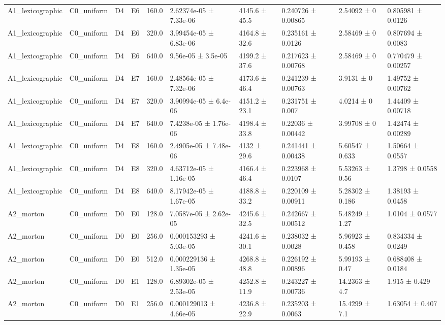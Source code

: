 \begin{table}
\begin{tabular}{llllllllll}
A1\_lexicographic & C0\_uniform & D4 & E6 & 160.0 & 2.62374e-05 ± 7.33e-06 & 4145.6 ± 45.5 & 0.240726 ± 0.00865 & 2.54092 ± 0 & 0.805981 ± 0.0126 \\
A1\_lexicographic & C0\_uniform & D4 & E6 & 320.0 & 3.99454e-05 ± 6.83e-06 & 4164.8 ± 32.6 & 0.235161 ± 0.0126 & 2.58469 ± 0 & 0.807694 ± 0.0083 \\
A1\_lexicographic & C0\_uniform & D4 & E6 & 640.0 & 9.56e-05 ± 3.5e-05 & 4199.2 ± 37.6 & 0.217623 ± 0.00768 & 2.58469 ± 0 & 0.770479 ± 0.00257 \\
A1\_lexicographic & C0\_uniform & D4 & E7 & 160.0 & 2.48564e-05 ± 7.32e-06 & 4173.6 ± 46.4 & 0.241239 ± 0.00763 & 3.9131 ± 0 & 1.49752 ± 0.00762 \\
A1\_lexicographic & C0\_uniform & D4 & E7 & 320.0 & 3.90994e-05 ± 6.4e-06 & 4151.2 ± 23.1 & 0.231751 ± 0.007 & 4.0214 ± 0 & 1.44409 ± 0.00718 \\
A1\_lexicographic & C0\_uniform & D4 & E7 & 640.0 & 7.4238e-05 ± 1.76e-06 & 4198.4 ± 33.8 & 0.22036 ± 0.00442 & 3.99708 ± 0 & 1.42474 ± 0.00289 \\
A1\_lexicographic & C0\_uniform & D4 & E8 & 160.0 & 2.4905e-05 ± 7.48e-06 & 4132 ± 29.6 & 0.241441 ± 0.00438 & 5.60547 ± 0.633 & 1.50664 ± 0.0557 \\
A1\_lexicographic & C0\_uniform & D4 & E8 & 320.0 & 4.63712e-05 ± 1.16e-05 & 4166.4 ± 46.4 & 0.223968 ± 0.0107 & 5.53263 ± 0.56 & 1.3798 ± 0.0558 \\
A1\_lexicographic & C0\_uniform & D4 & E8 & 640.0 & 8.17942e-05 ± 1.67e-05 & 4188.8 ± 33.2 & 0.220109 ± 0.00911 & 5.28302 ± 0.186 & 1.38193 ± 0.0458 \\
A2\_morton & C0\_uniform & D0 & E0 & 128.0 & 7.0587e-05 ± 2.62e-05 & 4245.6 ± 32.5 & 0.242667 ± 0.00512 & 5.48249 ± 1.27 & 1.0104 ± 0.0577 \\
A2\_morton & C0\_uniform & D0 & E0 & 256.0 & 0.000153293 ± 5.03e-05 & 4241.6 ± 30.1 & 0.238032 ± 0.0028 & 5.96923 ± 0.458 & 0.834334 ± 0.0249 \\
A2\_morton & C0\_uniform & D0 & E0 & 512.0 & 0.000229136 ± 1.35e-05 & 4268.8 ± 48.8 & 0.226192 ± 0.00896 & 5.99193 ± 0.47 & 0.688408 ± 0.0184 \\
A2\_morton & C0\_uniform & D0 & E1 & 128.0 & 6.89302e-05 ± 2.53e-05 & 4252.8 ± 11.9 & 0.243227 ± 0.00736 & 14.2363 ± 4.7 & 1.915 ± 0.429 \\
A2\_morton & C0\_uniform & D0 & E1 & 256.0 & 0.000129013 ± 4.66e-05 & 4236.8 ± 22.9 & 0.235203 ± 0.0063 & 15.4299 ± 7.1 & 1.63054 ± 0.407 \\

\end{tabular}
\end{table}
